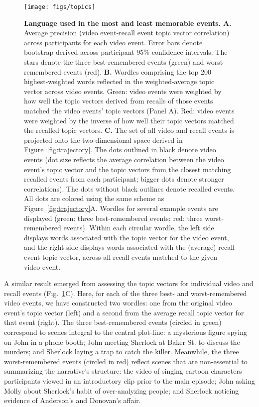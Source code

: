 \documentclass{article}
\begin{document}
\begin{figure}[tp]
\centering
\texttt{[image: figs/topics]}
\caption{\small \textbf{Language used in the most and least memorable events.} \textbf{A.} Average precision (video event-recall event topic vector correlation) across participants for each video event.  Error bars denote bootstrap-derived across-participant 95\% confidence intervals.  The stars denote the three best-remembered events (green) and worst-remembered events (red).  \textbf{B.} Wordles comprising the top 200 highest-weighted words reflected in the weighted-average topic vector across video events.  Green: video events were weighted by how well the topic vectors derived from recalls of those events matched the video events' topic vectors (Panel A).  Red: video events were weighted by the inverse of how well their topic vectors matched the recalled topic vectors.  \textbf{C.}  The set of all video and recall events is projected onto the two-dimensional space derived in Figure~\ref{fig:trajectory}.  The dots outlined in black denote video events (dot size reflects the average correlation between the video event's topic vector and the topic vectors from the closest matching recalled events from each participant; bigger dots denote stronger correlations).  The dots without black outlines denote recalled events.  All dots are colored using the same scheme as Figure~\ref{fig:trajectory}A.  Wordles for several example events are displayed (green: three best-remembered events; red: three worst-remembered events).  Within each circular wordle, the left side displays words associated with the topic vector for the video event, and the right side displays words associated with the (average) recall event topic vector, across all recall events matched to the given video event.}
\label{fig:topics}
\end{figure}

A similar result emerged from assessing the topic vectors for individual video and recall events (Fig.~\ref{fig:topics}C).  Here, for each of the three best- and worst-remembered video events, we have constructed two wordles: one from the original video event's topic vector (left) and a second from the average recall topic vector for that event (right).  The three best-remembered events (circled in green) correspond to scenes integral to the central plot-line: a mysterious figure spying on John in a phone booth; John meeting Sherlock at Baker St. to discuss the murders; and Sherlock laying a trap to catch the killer.  Meanwhile, the three worst-remembered events (circled in red) reflect scenes that are non-essential to summarizing the narrative's structure: the video of singing cartoon characters participants viewed in an introductory clip prior to the main episode; John asking Molly about Sherlock's habit of over-analyzing people; and Sherlock noticing evidence of Anderson's and Donovan's affair.
\end{document}
